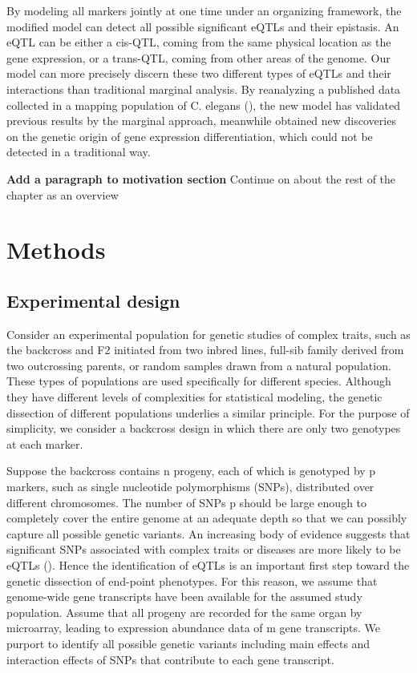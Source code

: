 \documentclass[]{book}
\theoremstyle{definition}
\theoremstyle{definition}
\theoremstyle{remark}
\begin{document}
By modeling all markers jointly at one time under an organizing
framework, the modified model can detect all possible significant eQTLs
and their epistasis. An eQTL can be either a cis-QTL, coming from the
same physical location as the gene expression, or a trans-QTL, coming
from other areas of the genome. Our model can more precisely discern
these two different types of eQTLs and their interactions than
traditional marginal analysis. By reanalyzing a published data collected
in a mapping population of C. elegans (\cite{rockman2010selection}), the
new model has validated previous results by the marginal approach,
meanwhile obtained new discoveries on the genetic origin of gene
expression differentiation, which could not be detected in a traditional
way.

\textbf{Add a paragraph to motivation section} Continue on about the
rest of the chapter as an overview

\section{Methods}\label{methods}

\subsection{Experimental design}\label{experimental-design}

Consider an experimental population for genetic studies of complex
traits, such as the backcross and F2 initiated from two inbred lines,
full-sib family derived from two outcrossing parents, or random samples
drawn from a natural population. These types of populations are used
specifically for different species. Although they have different levels
of complexities for statistical modeling, the genetic dissection of
different populations underlies a similar principle. For the purpose of
simplicity, we consider a backcross design in which there are only two
genotypes at each marker.

Suppose the backcross contains n progeny, each of which is genotyped by
p markers, such as single nucleotide polymorphisms (SNPs), distributed
over different chromosomes. The number of SNPs p should be large enough
to completely cover the entire genome at an adequate depth so that we
can possibly capture all possible genetic variants. An increasing body
of evidence suggests that significant SNPs associated with complex
traits or diseases are more likely to be eQTLs (\cite{li2013using}).
Hence the identification of eQTLs is an important first step toward the
genetic dissection of end-point phenotypes. For this reason, we assume
that genome-wide gene transcripts have been available for the assumed
study population. Assume that all progeny are recorded for the same
organ by microarray, leading to expression abundance data of m gene
transcripts. We purport to identify all possible genetic variants
including main effects and interaction effects of SNPs that contribute
to each gene transcript.
\end{document}
